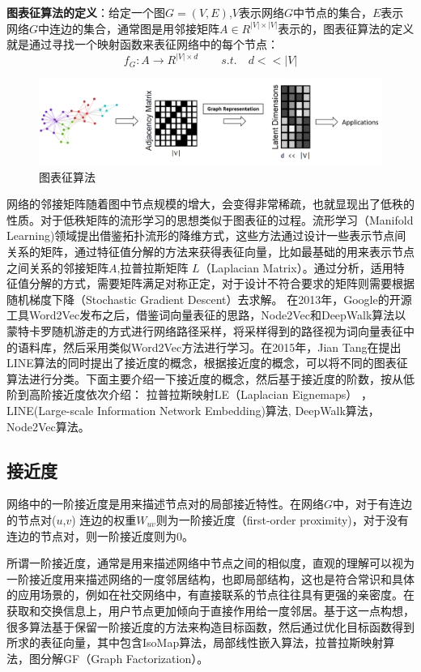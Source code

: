 \textbf{图表征算法的定义}：给定一个图$G = (V,E)$,$V$表示网络$G$中节点的集合，$E$表示网络$G$中连边的集合，通常图是用邻接矩阵$A \in R^{|V|\times|V|}$表示的，图表征算法的定义就是通过寻找一个映射函数来表征网络中的每个节点：
\begin{equation}
f_G: A \rightarrow R^{|V| \times d} \qquad s.t.\quad d<<|V|
\end{equation}

\begin{figure}
	\centering
	\includegraphics[width=5.5in]{figures/network_embedding}
	\caption{图表征算法}
\end{figure}


网络的邻接矩阵随着图中节点规模的增大，会变得非常稀疏，也就显现出了低秩的性质。对于低秩矩阵的流形学习的思想类似于图表征的过程。流形学习（Manifold Learning)领域提出借鉴拓扑流形的降维方式，这些方法通过设计一些表示节点间关系的矩阵，通过特征值分解的方法来获得表征向量，比如最基础的用来表示节点之间关系的邻接矩阵$A$,拉普拉斯矩阵 $L$（Laplacian Matrix）。通过分析，适用特征值分解的方式，需要矩阵满足对称正定，对于设计不符合要求的矩阵则需要根据随机梯度下降（Stochastic Gradient Descent）去求解。
在2013年，Google的开源工具Word2Vec\cite{mikolov2013efficient}发布之后，借鉴词向量表征的思路，Node2Vec和DeepWalk算法以蒙特卡罗随机游走的方式进行网络路径采样，将采样得到的路径视为词向量表征中的语料库，然后采用类似Word2Vec方法进行学习。在2015年，Jian Tang\cite{tang2015line}在提出LINE算法的同时提出了接近度的概念，根据接近度的概念，可以将不同的图表征算法进行分类。下面主要介绍一下接近度的概念，然后基于接近度的阶数，按从低阶到高阶接近度依次介绍：%
拉普拉斯映射LE（Laplacian Eignemaps） ， LINE(Large-scale Information Network Embedding)算法, DeepWalk算法，Node2Vec算法。
\subsection{接近度}
网络中的一阶接近度是用来描述节点对的局部接近特性。在网络$G$中，对于有连边的节点对($u$,$v$)
连边的权重$W_{uv}$则为一阶接近度（first-order proximity)，对于没有连边的节点对，则一阶接近度则为0。

所谓一阶接近度，通常是用来描述网络中节点之间的相似度，直观的理解可以视为一阶接近度用来描述网络的一度邻居结构，也即局部结构，这也是符合常识和具体的应用场景的，例如在社交网络中，有直接联系的节点往往具有更强的亲密度。在获取和交换信息上，用户节点更加倾向于直接作用给一度邻居。基于这一点构想，很多算法基于保留一阶接近度的方法来构造目标函数，然后通过优化目标函数得到所求的表征向量，其中包含IsoMap算法，局部线性嵌入算法，拉普拉斯映射算法，图分解GF\cite{ahmed2013distributed}（Graph Factorization）。

